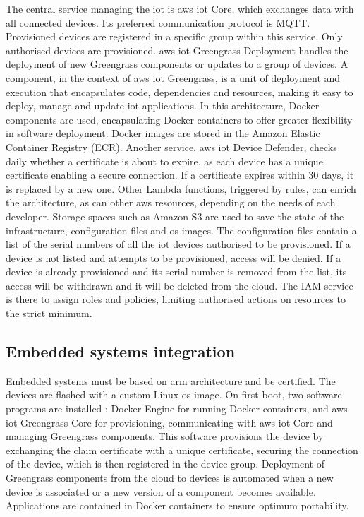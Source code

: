 The central service managing the \acrshort{iot} is \gls{aws} \acrshort{iot} Core, which exchanges data with all connected devices. Its preferred communication protocol is MQTT. Provisioned devices are registered in a specific group within this service. Only authorised devices are provisioned. \gls{aws} \acrshort{iot} Greengrass Deployment handles the deployment of new Greengrass components or updates to a group of devices. A component, in the context of \gls{aws} \acrshort{iot} Greengrass, is a unit of deployment and execution that encapsulates code, dependencies and resources, making it easy to deploy, manage and update \acrshort{iot} applications. In this architecture, Docker components are used, encapsulating Docker containers to offer greater flexibility in software deployment. Docker images are stored in the Amazon Elastic Container Registry (ECR). Another service, \gls{aws} \acrshort{iot} Device Defender, checks daily whether a certificate is about to expire, as each device has a unique certificate enabling a secure connection. If a certificate expires within 30 days, it is replaced by a new one. Other Lambda functions, triggered by rules, can enrich the architecture, as can other \gls{aws} resources, depending on the needs of each developer. Storage spaces such as Amazon S3 are used to save the state of the infrastructure, configuration files and \acrshort{os} images. The configuration files contain a list of the serial numbers of all the \acrshort{iot} devices authorised to be provisioned. If a device is not listed and attempts to be provisioned, access will be denied. If a device is already provisioned and its serial number is removed from the list, its access will be withdrawn and it will be deleted from the \gls{cloud}. The IAM service is there to assign roles and policies, limiting authorised actions on resources to the strict minimum.

\subsection{Embedded systems integration}
Embedded systems must be based on \gls{arm} architecture and be  certified. The devices are flashed with a custom Linux \acrshort{os} image. On first boot, two software programs are installed : Docker Engine for running Docker containers, and \gls{aws} \acrshort{iot} Greengrass Core for \gls{provisioning}, communicating with \gls{aws} \acrshort{iot} Core and managing Greengrass components. This software provisions the device by exchanging the claim certificate with a unique certificate, securing the connection of the device, which is then registered in the device group. Deployment of Greengrass components from the \gls{cloud} to devices is automated when a new device is associated or a new version of a component becomes available. Applications are contained in Docker containers to ensure optimum portability.